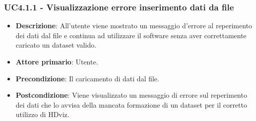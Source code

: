 \subsubsection{UC4.1.1 - Visualizzazione errore inserimento dati da file}
\begin{itemize}
    \item \textbf{Descrizione}: All'utente viene mostrato un messaggio d'errore al reperimento
                                dei dati dal file e continua ad utilizzare 
                                il software senza aver correttamente caricato un dataset valido.

    \item \textbf{Attore primario}: Utente.
    
    \item \textbf{Precondizione}:   Il caricamento di dati dal file.

    \item \textbf{Postcondizione}:  Viene visualizzato un messaggio di errore sul reperimento dei 
                                    dati che lo avvisa della mancata formazione di un dataset per il
                                    corretto utilizzo di HDviz.

\end{itemize}


